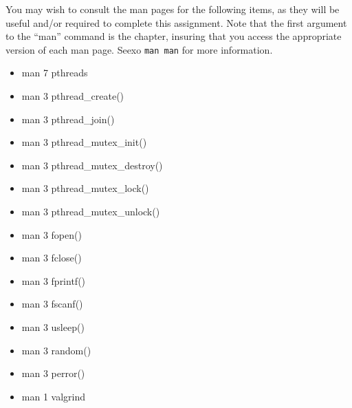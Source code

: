\documentclass[12pt]{article}
\begin{document}
You may wish to consult the man pages for the following items, as they
will be useful and/or required to complete this assignment. Note that
the first argument to the ``man'' command is the chapter, insuring
that you access the appropriate version of each man page. Seexo
\texttt{man man} for more information.
\begin{itemize}
\item man 7 pthreads
\item man 3 pthread\_create()
\item man 3 pthread\_join()
\item man 3 pthread\_mutex\_init()
\item man 3 pthread\_mutex\_destroy()
\item man 3 pthread\_mutex\_lock()
\item man 3 pthread\_mutex\_unlock()
\item man 3 fopen()
\item man 3 fclose()
\item man 3 fprintf()
\item man 3 fscanf()
\item man 3 usleep()
\item man 3 random()
\item man 3 perror()
\item man 1 valgrind
\end{itemize}
\end{document}
